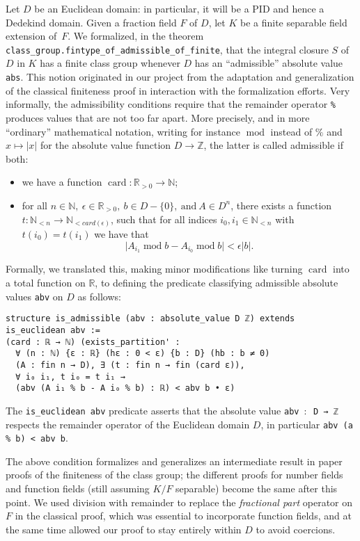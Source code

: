 \documentclass[sn-mathphys]{sn-jnl}%
\newcommand{\lean}[1]{\texttt{#1}\xspace}
\newcommand{\N}{\mathbb{N}}
\renewcommand{\R}{\mathbb{R}}
\renewcommand{\Z}{\mathbb{Z}}
\begin{document}
Let $D$ be an Euclidean domain: in particular, it will be a PID and hence a Dedekind domain. Given a fraction field $F$ of $D$, let $K$ be a finite separable field extension of~$F$.
We formalized, in the theorem \lean{class\_group.fintype\_of\_\-admissible\_\-of\_finite}, that the integral closure $S$ of $D$ in $K$ has a finite class group whenever $D$ has an ``admissible'' absolute value \lean{abs}.
This notion originated in our project from the adaptation and generalization of the classical finiteness proof in interaction with the formalization efforts.
Very informally, the admissibility conditions require that the remainder operator \lean{\%} produces values that are not too far apart.
More precisely, and in more ``ordinary'' mathematical notation, writing for instance $\operatorname{mod}$ instead of $\%$ and $x \mapsto \lvert x \rvert $ for the absolute value function $D \to \Z$, the latter is called admissible if both:
\begin{itemize}
\item we have a function $\operatorname{card}: \R_{>0} \to \N$;
\item for all $n \in \N,\ \epsilon \in \R_{>0},\ b \in D-\{0\},\ \text{and}\ A \in D^n$,
there exists a function $t : \N_{< n} \to \N_{< card(\epsilon)}$,
such that for all indices $i_0, i_1 \in \N_{<n}$ with $t(i_0)=t(i_1)$ we have that
\[ \lvert A_{i_1} \operatorname{mod} b - A_{i_0} \operatorname{mod} b \rvert < \epsilon \lvert b \rvert.\]
\end{itemize}
Formally, we translated this, making minor modifications like turning $\operatorname{card}$ into a total function on $\R$, to defining the predicate classifying admissible absolute values \lean{abv} on $D$ as follows:
\pagebreak[3] %
\begin{lstlisting}
structure is_admissible (abv : absolute_value D ℤ) extends is_euclidean abv :=
(card : ℝ → ℕ) (exists_partition' :
  ∀ (n : ℕ) {ε : ℝ} (hε : 0 < ε) {b : D} (hb : b ≠ 0)
  (A : fin n → D), ∃ (t : fin n → fin (card ε)),
  ∀ i₀ i₁, t i₀ = t i₁ →
  (abv (A i₁ % b - A i₀ % b) : ℝ) < abv b • ε)
\end{lstlisting}
The \lean{is\_euclidean abv} predicate asserts that the absolute value \lean{abv $:$ D → ℤ} respects the remainder operator of the Euclidean domain $D$, in particular \lean{abv (a \% b) < abv b}.

The above condition formalizes and generalizes an intermediate result in paper proofs of the finiteness of the class group;
the different proofs for number fields and function fields (still assuming $K/F$ separable) become the same after this point.
We used division with remainder to replace the \emph{fractional part} operator on $F$ in the classical proof, which was essential to incorporate function fields, and at the same time allowed our proof to stay entirely within $D$ to avoid coercions.
\end{document}
